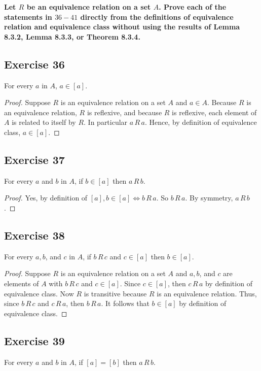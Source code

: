 \documentclass[14pt]{extarticle}
\newcommand{\cy}{\color{cyan}}
\begin{document}
{\bf \cy Let $R$ be an equivalence relation on a set $A$. Prove each of the statements in $36-41$ directly from the
definitions of equivalence relation and equivalence class without using the results of Lemma 8.3.2, Lemma 8.3.3, or
Theorem 8.3.4.}

\subsection{Exercise 36}
For every $a$ in $A$, \(a \in [a]\).

\begin{proof}
        Suppose $R$ is an equivalence relation on a set $A$ and \(a \in A\). Because $R$ is an equivalence relation, $R$ is
        reflexive, and because $R$ is reflexive, each element of $A$ is related to itself by $R$. In particular \(a\,R\,a\).
        Hence, by definition of equivalence class, \(a \in [a]\).
\end{proof}

\subsection{Exercise 37}
For every $a$ and $b$ in $A$, if \(b \in [a]\) then \(a \,R\, b\).

\begin{proof}
        Yes, by definition of \([a], b \in [a] \iff b \,R\,a\). So \(b \,R\, a\). By symmetry, \(a \,R\, b\).
\end{proof}

\subsection{Exercise 38}
For every \(a, b\), and \(c\) in \(A\), if \(b \,R\, c\) and \(c \in [a]\) then \(b \in [a]\).

\begin{proof}
        Suppose $R$ is an equivalence relation on a set $A$ and \(a, b\), and $c$ are elements of $A$ with \(b \,R\, c\) and
        \(c \in [a]\). Since \(c \in [a]\), then \(c \,R\, a\) by definition of equivalence class. Now \(R\) is transitive
        because \(R\) is an equivalence relation. Thus, since \(b \,R\, c\) and \(c \,R\, a\), then \(b \,R\, a\). It follows
        that \(b \in [a]\) by definition of equivalence class.
\end{proof}

\subsection{Exercise 39}
For every $a$ and $b$ in $A$, if \([a] = [b]\) then \(a \,R\, b\).
\end{document}

